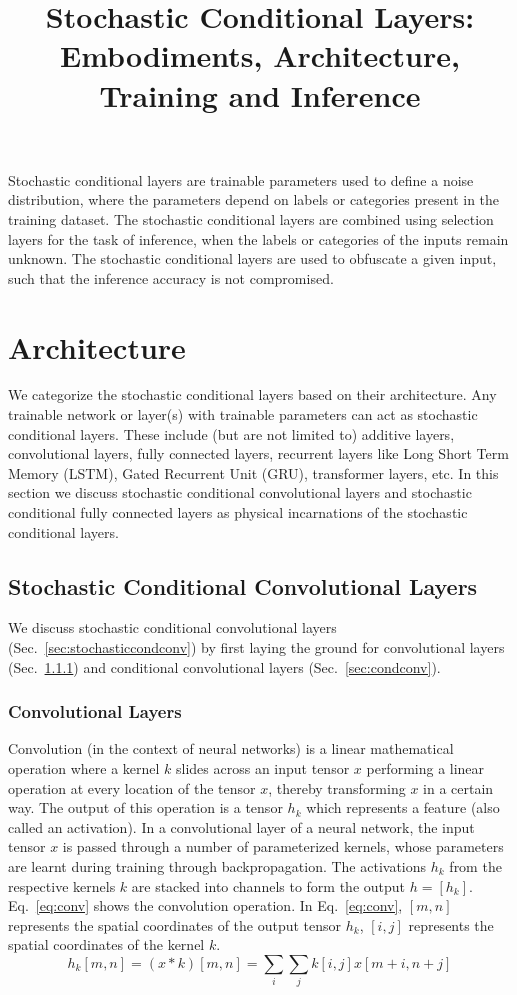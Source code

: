 \documentclass[12pt, letterpaper]{article}
\title{Stochastic Conditional Layers: Embodiments, Architecture, Training and Inference}
\date{}
\begin{document}
\vspace{-5cm}
\maketitle
\vspace{-2cm}
Stochastic conditional layers are trainable parameters used to define a noise distribution, where the parameters depend on labels or categories present in the training dataset. The stochastic conditional layers are combined using selection layers for the task of inference, when the labels or categories of the inputs remain unknown. The stochastic conditional layers are used to obfuscate a given input, such that the inference accuracy is not compromised.  

\section{Architecture}
We categorize the stochastic conditional layers based on their architecture.
Any trainable network or layer(s) with trainable parameters can act as stochastic conditional layers. 
These include (but are not limited to) additive layers, convolutional layers, fully connected layers, recurrent layers like Long Short Term Memory (LSTM), Gated Recurrent Unit (GRU), transformer layers, etc. In this section we discuss stochastic conditional convolutional layers and  stochastic conditional fully connected layers as physical incarnations of the stochastic conditional layers. 

\subsection{Stochastic Conditional Convolutional Layers}
We discuss stochastic conditional convolutional layers (Sec.~\ref{sec:stochasticcondconv}) by first laying the ground for convolutional layers (Sec.~\ref{sec:conv}) and conditional convolutional layers (Sec.~\ref{sec:condconv}).

\subsubsection{Convolutional Layers}
\label{sec:conv}
Convolution (in the context of neural networks) is a linear mathematical operation where a kernel $k$ slides across an input tensor $x$ performing a linear operation at every location of the tensor $x$, thereby transforming $x$ in a certain way. 
The output of this operation is a tensor $h_k$ which represents a feature (also called an activation). 
In a convolutional layer of a neural network, the input tensor $x$ is passed through a number of parameterized kernels, whose parameters are learnt during training through backpropagation. 
The activations $h_k$ from the respective kernels $k$ are stacked into channels to form the output $h=[h_k]$. Eq.~\eqref{eq:conv} shows the convolution operation. 
In Eq.~\eqref{eq:conv}, $[m,n]$ represents the spatial coordinates of the output tensor $h_k$, $[i,j]$ represents the spatial coordinates of the kernel $k$.
\begin{equation}
  h_k[m,n]=(x * k)[m,n]=\sum_i \sum_j k[i,j]x[m+i,n+j]
  \label{eq:conv}
\end{equation}
\end{document}
